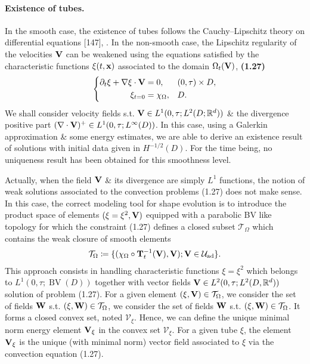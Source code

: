 \documentclass[oneside]{book}
\numberwithin{equation}{section}
\begin{document}
\paragraph{Existence of tubes.} In the smooth case, the existence of tubes follows the Cauchy--Lipschitz theory on differential equations [147], \cite{Delfour_Zolesio2001}. In the non-smooth case, the Lipschitz regularity of the velocities ${\bf V}$ can be weakened using the equations satisfied by the characteristic functions $\xi(t,{\bf x})$ associated to the domain $\Omega_t({\bf V})$, \textbf{(1.27)}
\begin{equation*}
	\left\{\begin{split}
		\partial_t\xi + \nabla\xi\cdot{\bf V} &= 0,&&(0,\tau)\times D,\\
		\xi_{t=0} &= \chi_\Omega,&& D.
	\end{split}\right.
\end{equation*}
We shall consider velocity fields s.t. ${\bf V}\in L^1(0,\tau;L^2(D;\mathbb{R}^d))$ \& the divergence positive part $(\nabla\cdot{\bf V})^+\in L^1(0,\tau;L^\infty(D))$. In this case, using a Galerkin approximation \& some energy estimates, we are able to derive an existence result of solutions with initial data given in $H^{-1/2}(D)$. For the time being, no uniqueness result has been obtained for this smoothness level.

Actually, when the field ${\bf V}$ \& its divergence are simply $L^1$ functions, the notion of weak solutions associated to the convection problems (1.27) does not make sense. In this case, the correct modeling tool for shape evolution is to introduce the product space of elements $(\xi = \xi^2,{\bf V})$ equipped with a parabolic BV like topology for which the constraint (1.27) defines a closed subset $\mathcal{T}_\Omega$ which contains the weak closure of smooth elements
\begin{align*}
	\mathcal{T}_\Omega\coloneqq\{(\chi_\Omega\circ{\bf T}_t^{-1}({\bf V}),{\bf V});{\bf V}\in\mathcal{U}_{\rm ad}\}.
\end{align*}
This approach consists in handling characteristic functions $\xi = \xi^2$ which belongs to $L^1(0,\tau;\operatorname{BV}(D))$ together with vector fields ${\bf V}\in L^2(0,\tau;L^2(D,\mathbb{R}^d))$ solution of problem (1.27). For a given element $(\xi,{\bf V})\in\mathcal{T}_\Omega$, we consider the set of fields ${\bf W}$ s.t. $(\xi,{\bf W})\in\mathcal{T}_\Omega$, we consider the set of fields ${\bf W}$ s.t. $(\xi,{\bf W})\in\mathcal{T}_\Omega$. It forms a closed convex set, noted $\mathcal{V}_\xi$. Hence, we can define the unique minimal norm energy element ${\bf V}_\xi$ in the convex set $\mathcal{V}_\xi$. For a given tube $\xi$, the element ${\bf V}_\xi$ is the unique (with minimal norm) vector field associated to $\xi$ via the convection equation (1.27).
\end{document}
